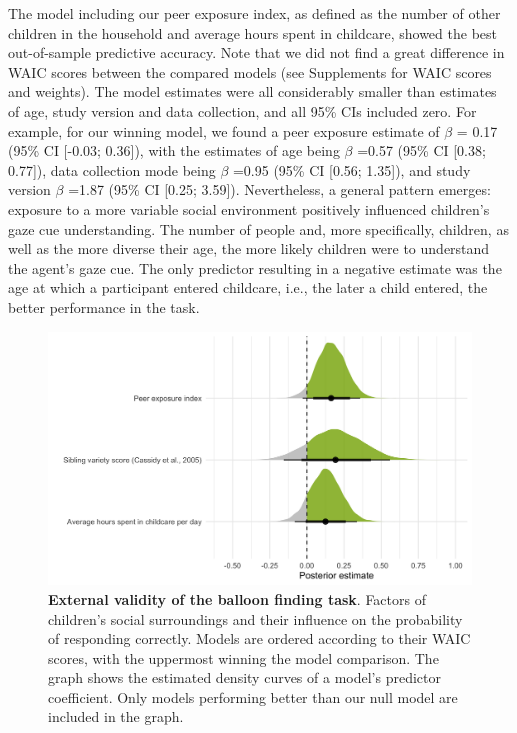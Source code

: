 \documentclass[
  man,floatsintext]{apa6}
\begin{document}
The model including our peer exposure index, as defined as the number of other children in the household and average hours spent in childcare, showed the best out-of-sample predictive accuracy. Note that we did not find a great difference in WAIC scores between the compared models (see Supplements for WAIC scores and weights). The model estimates were all considerably smaller than estimates of age, study version and data collection, and all 95\% CIs included zero. For example, for our winning model, we found a peer exposure estimate of \(\beta\) =
0.17 (95\% CI {[}-0.03; 0.36{]}),
with the estimates of age being \(\beta\) =0.57 (95\% CI {[}0.38; 0.77{]}), data collection mode being \(\beta\) =0.95 (95\% CI {[}0.56; 1.35{]}), and study version \(\beta\) =1.87 (95\% CI {[}0.25; 3.59{]}). Nevertheless, a general pattern emerges: exposure to a more variable social environment positively influenced children's gaze cue understanding. The number of people and, more specifically, children, as well as the more diverse their age, the more likely children were to understand the agent's gaze cue. The only predictor resulting in a negative estimate was the age at which a participant entered childcare, i.e., the later a child entered, the better performance in the task.




\begin{figure}

{\centering \includegraphics[width=1\linewidth]{../figures/extvali_results} 

}

\caption{\textbf{External validity of the balloon finding task}.
Factors of children's social surroundings and their influence on the probability of responding correctly. Models are ordered according to their WAIC scores, with the uppermost winning the model comparison. The graph shows the estimated density curves of a model's predictor coefficient. Only models performing better than our null model are included in the graph.}\label{fig:fig4}
\end{figure}
\end{document}
